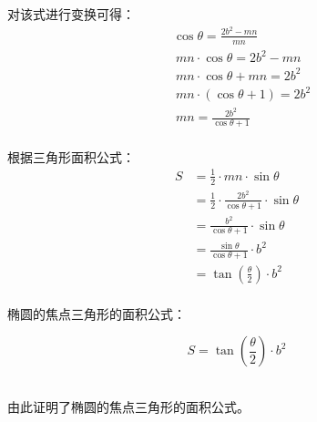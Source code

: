 \documentclass[UTF8]{ctexart}
\begin{document}
\newpage

    对该式进行变换可得：
    \begin{align}
        &\cos{\theta}=\frac{2b^2-mn}{mn}\\[5mm]
        &~mn\cdot\cos{\theta}=2b^2-mn\\[5mm]
        &~mn\cdot\cos{\theta}+mn=2b^2\\[5mm]
        &~mn\cdot(\cos{\theta}+1)=2b^2\\[5mm]
        &~mn=\frac{2b^2}{\cos{\theta}+1}
    \end{align}\\
    根据三角形面积公式：
    \begin{align}
        S&=\frac{1}{2}\cdot mn\cdot\sin{\theta}\\[5mm]
        &=\frac{1}{2}\cdot \frac{2b^2}{\cos{\theta}+1}\cdot\sin{\theta}\\[5mm]
        &=\frac{b^2}{\cos{\theta}+1}\cdot\sin{\theta}\\[5mm]
        &=\frac{\sin{\theta}}{\cos{\theta}+1}\cdot b^2\\[5mm]
        &=\tan{\left(\frac{\theta}{2}\right)}\cdot b^2
    \end{align}\\
    椭圆的焦点三角形的面积公式：
    \begin{large}
        \begin{equation*}
            S=\tan{\left(\frac{\theta}{2}\right)}\cdot b^2
        \end{equation*}
    \end{large}\\
    由此证明了椭圆的焦点三角形的面积公式。

\newpage
\end{document}
